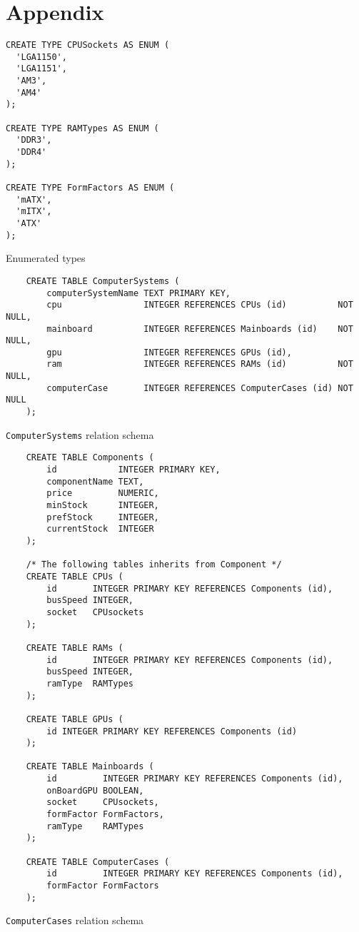 \documentclass[12pt,a4paper]{article}
\begin{document}
\appendix

\section{Appendix}

\begin{listing}
\begin{verbatim}
CREATE TYPE CPUSockets AS ENUM (
  'LGA1150',
  'LGA1151',
  'AM3',
  'AM4'
);

CREATE TYPE RAMTypes AS ENUM (
  'DDR3',
  'DDR4'
);

CREATE TYPE FormFactors AS ENUM (
  'mATX',
  'mITX',
  'ATX'
);
\end{verbatim}
\caption{Enumerated types}
\label{enum}
\end{listing}

\begin{listing}[!htbp]
    \begin{verbatim}
    CREATE TABLE ComputerSystems (
        computerSystemName TEXT PRIMARY KEY,
        cpu                INTEGER REFERENCES CPUs (id)          NOT NULL,
        mainboard          INTEGER REFERENCES Mainboards (id)    NOT NULL,
        gpu                INTEGER REFERENCES GPUs (id),
        ram                INTEGER REFERENCES RAMs (id)          NOT NULL,
        computerCase       INTEGER REFERENCES ComputerCases (id) NOT NULL
    );
    \end{verbatim}
    \caption{\texttt{ComputerSystems} relation schema}
    \label{lst:computersystem}
\end{listing}

\begin{listing}[!htbp]
    \begin{verbatim}
    CREATE TABLE Components (
        id            INTEGER PRIMARY KEY,
        componentName TEXT,
        price         NUMERIC,
        minStock      INTEGER,
        prefStock     INTEGER,
        currentStock  INTEGER
    );
    
    /* The following tables inherits from Component */
    CREATE TABLE CPUs (
        id       INTEGER PRIMARY KEY REFERENCES Components (id),
        busSpeed INTEGER,
        socket   CPUsockets
    );
    
    CREATE TABLE RAMs (
        id       INTEGER PRIMARY KEY REFERENCES Components (id),
        busSpeed INTEGER,
        ramType  RAMTypes
    );
    
    CREATE TABLE GPUs (
        id INTEGER PRIMARY KEY REFERENCES Components (id)
    );
    
    CREATE TABLE Mainboards (
        id         INTEGER PRIMARY KEY REFERENCES Components (id),
        onBoardGPU BOOLEAN,
        socket     CPUsockets,
        formFactor FormFactors,
        ramType    RAMTypes
    );
    
    CREATE TABLE ComputerCases (
        id         INTEGER PRIMARY KEY REFERENCES Components (id),
        formFactor FormFactors
    );
    \end{verbatim}
    \caption{\texttt{ComputerCases} relation schema}
    \label{lst:CaseRelation}
\end{listing}
\end{document}
